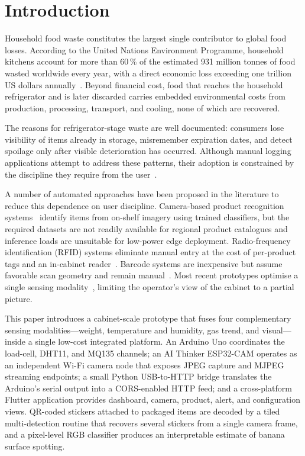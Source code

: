 \section{Introduction}
\label{sec:introduction}

Household food waste constitutes the largest single contributor to
global food losses. According to the United Nations Environment
Programme, household kitchens account for more than 60\,\% of the
estimated 931 million tonnes of food wasted worldwide every year, with
a direct economic loss exceeding one trillion US dollars
annually~\cite{unep2024foodwaste}. Beyond financial cost, food that
reaches the household refrigerator and is later discarded carries
embedded environmental costs from production, processing, transport,
and cooling, none of which are recovered.

The reasons for refrigerator-stage waste are well documented:
consumers lose visibility of items already in storage, misremember
expiration dates, and detect spoilage only after visible deterioration
has occurred. Although manual logging applications attempt to address
these patterns, their adoption is constrained by the discipline they
require from the user~\cite{nandini2023userconvenience}.

A number of automated approaches have been proposed in the literature
to reduce this dependence on user discipline. Camera-based product
recognition systems~\cite{ericyang2022smartfridge,vadlamudi2025fridgesense}
identify items from on-shelf imagery using trained classifiers, but
the required datasets are not readily available for regional product
catalogues and inference loads are unsuitable for low-power edge
deployment. Radio-frequency identification (RFID) systems eliminate
manual entry at the cost of per-product tags and an in-cabinet
reader~\cite{abhiram2025iotmonitor}. Barcode systems are inexpensive
but assume favorable scan geometry and remain
manual~\cite{pelobello2026chickout}. Most recent prototypes optimise a
single sensing modality~\cite{sarawathi2025spoilage,sarkar2024proactive},
limiting the operator's view of the cabinet to a partial picture.

This paper introduces a cabinet-scale prototype that fuses four
complementary sensing modalities---weight, temperature and humidity,
gas trend, and visual---inside a single low-cost integrated platform.
An Arduino Uno coordinates the load-cell, DHT11, and MQ135 channels;
an AI Thinker ESP32-CAM operates as an independent Wi-Fi camera node
that exposes JPEG capture and MJPEG streaming endpoints; a small
Python USB-to-HTTP bridge translates the Arduino's serial output into
a CORS-enabled HTTP feed; and a cross-platform Flutter application
provides dashboard, camera, product, alert, and configuration views.
QR-coded stickers attached to packaged items are decoded by a tiled
multi-detection routine that recovers several stickers from a single
camera frame, and a pixel-level RGB classifier produces an
interpretable estimate of banana surface spotting.

